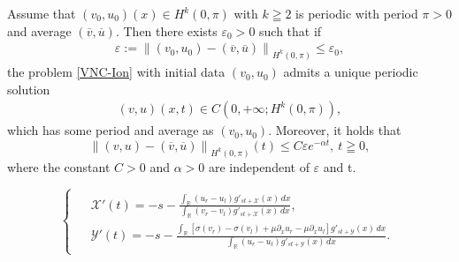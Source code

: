 \documentclass[10pt,a4paper]{amsart}
\def\R{\mathbb{R}}
\def\X{\mathcal{X}}
\def\Y{\mathcal{Y}}
\def\p{\partial}
\newcommand{\norm}[1]{\left\lVert #1 \right\rVert}
\begin{document}
\begin{lemma}\label{decay}
	Assume that $(v_0,u_0)(x) \in H^k(0,\pi)$ with $k\geqq 2$ is periodic with period $\pi > 0$ and average $(\overline{v},\overline{u})$. Then there
	exists $\varepsilon_0>0$ such that if 
	\begin{align*}
		\varepsilon:=\norm{(v_0,u_0)-(\overline{v},\overline{u})}_{H^k(0,\pi)}\leq \varepsilon_0,
	\end{align*}
	the problem \eqref{VNC-Ion} with initial data $(v_0,u_0)$ admits a unique periodic solution
	\begin{align*}
		(v,u)(x,t)\in C(0,+\infty;H^k(0,\pi)),
	\end{align*}
	which has some period and average as $(v_0,u_0)$. Moreover, it holds that 
	\begin{equation}\label{decay1}
		\norm{(v,u)-(\overline{v},\overline{u})}_{H^k(0,\pi)}(t)\leq C\varepsilon e^{-\alpha t},~t\geqq 0,
	\end{equation}
	where the constant $C>0$ and $\alpha>0$ are independent of $\varepsilon$ and t.
\end{lemma}

\begin{equation}\label{XY}
	\begin{cases}
		\begin{aligned}
			&\X'(t)=-s-\frac{\int_{\R}(u_r-u_l)g'_{st+\X}(x)  \,dx }{\int_{\R}(v_r-v_l)g'_{st+\X}(x)  \,dx },\\
			&\Y'(t)=-s-\frac{\int_{\R}[\sigma(v_r)-\sigma(v_l)+\mu\p_x u_r-\mu\p_x u_l]g'_{st+\Y}(x)\,dx }{\int_{\R}(u_r-u_l)g'_{st+\Y}(x) \,dx}.
		\end{aligned}
	\end{cases}
\end{equation}
\end{document}

